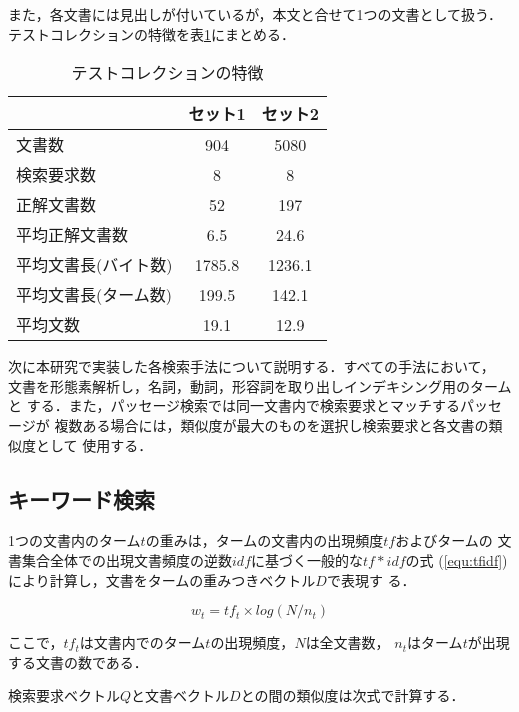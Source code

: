 また，各文書には見出しが付いているが，本文と合せて1つの文書として扱う．
テストコレクションの特徴を表\ref{tab:collection}にまとめる．

\begin{table}[htbp]
\begin{center}
\caption{テストコレクションの特徴}\label{tab:collection}
\begin{tabular}{lcc}\hline
       	   		& セット1 & セット2 \\\hline
文書数     		& 904	 & 5080   \\
検索要求数 		&    8   &   8 \\
正解文書数 		&  52 	 &  197   \\
平均正解文書数  	&  6.5	 &  24.6  \\
平均文書長(バイト数) 	& 1785.8 & 1236.1 \\
平均文書長(ターム数) 	& 199.5	 & 142.1  \\
平均文数		&  19.1	 &  12.9  \\\hline
\end{tabular}
\end{center}
\end{table}

\vspace{-5mm}
次に本研究で実装した各検索手法について説明する．すべての手法において，
文書を形態素解析し，名詞，動詞，形容詞を取り出しインデキシング用のタームと
する．また，パッセージ検索では同一文書内で検索要求とマッチするパッセージが
複数ある場合には，類似度が最大のものを選択し検索要求と各文書の類似度として
使用する．

\subsection{キーワード検索}\label{subsec:keyword}

1つの文書内のターム$t$の重みは，タームの文書内の出現頻度$tf$およびタームの
文書集合全体での出現文書頻度の逆数$idf$に基づく一般的な$tf*idf$の式
(\ref{equ:tfidf})により計算し，文書をタームの重みつきベクトル$D$で表現す
る．

\vspace{-2mm}
\begin{equation}\label{equ:tfidf}
w_{t} = tf_{t} \times log(N/n_{t})
\end{equation}

\noindent ここで，$tf_{t}$は文書内でのターム$t$の出現頻度，$N$は全文書数，
$n_{t}$はターム$t$が出現する文書の数である．

検索要求ベクトル$Q$と文書ベクトル$D$との間の類似度は次式で計算する．

